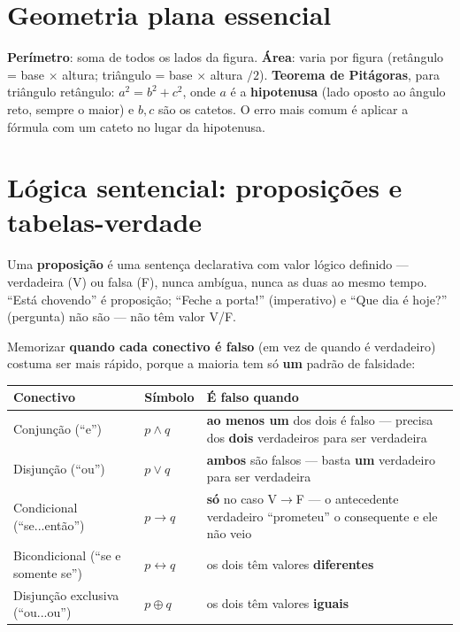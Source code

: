 \section{Geometria plana essencial}

\begin{conceito}
\textbf{Perímetro}: soma de todos os lados da figura. \textbf{Área}: varia
por figura (retângulo = base $\times$ altura; triângulo = base $\times$
altura $/2$). \textbf{Teorema de Pitágoras}, para triângulo retângulo:
$a^2 = b^2 + c^2$, onde $a$ é a \textbf{hipotenusa} (lado oposto ao ângulo
reto, sempre o maior) e $b,c$ são os catetos. O erro mais comum é aplicar
a fórmula com um cateto no lugar da hipotenusa.
\end{conceito}

\section{Lógica sentencial: proposições e tabelas-verdade}

\begin{conceito}
Uma \textbf{proposição} é uma sentença declarativa com valor lógico
definido --- verdadeira (V) ou falsa (F), nunca ambígua, nunca as duas ao
mesmo tempo. “Está chovendo” é proposição; “Feche a porta!” (imperativo) e
“Que dia é hoje?” (pergunta) não são --- não têm valor V/F.
\end{conceito}

\begin{conceito}
Memorizar \textbf{quando cada conectivo é falso} (em vez de quando é
verdadeiro) costuma ser mais rápido, porque a maioria tem só \textbf{um}
padrão de falsidade:

\begin{center}
\begin{tabular}{@{}p{4.4cm}p{1.6cm}p{4.4cm}@{}}
\toprule
\textbf{Conectivo} & \textbf{Símbolo} & \textbf{É falso quando} \\
\midrule
Conjunção (“e”) & $p \land q$ & \textbf{ao menos um} dos dois é falso ---
precisa dos \textbf{dois} verdadeiros para ser verdadeira \\
Disjunção (“ou”) & $p \lor q$ & \textbf{ambos} são falsos --- basta
\textbf{um} verdadeiro para ser verdadeira \\
Condicional (“se...então”) & $p \to q$ & \textbf{só} no caso
V$\to$F --- o antecedente verdadeiro “prometeu” o consequente e ele não
veio \\
Bicondicional (“se e somente se”) & $p \leftrightarrow q$ & os dois têm
valores \textbf{diferentes} \\
Disjunção exclusiva (“ou...ou”) & $p \oplus q$ & os dois têm valores
\textbf{iguais} \\
\bottomrule
\end{tabular}
\end{center}
\end{conceito}

